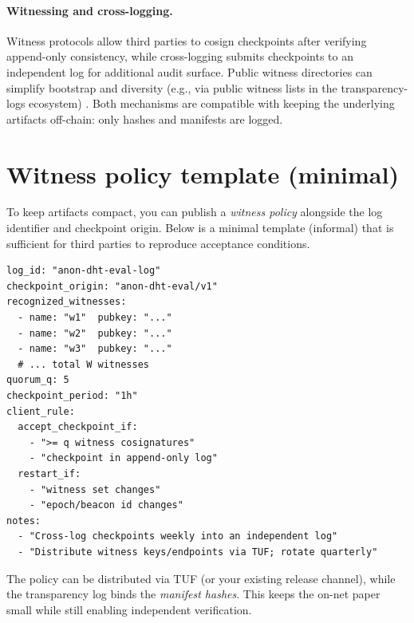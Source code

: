 \documentclass[11pt]{article}
\begin{document}
\paragraph{Witnessing and cross-logging.}
Witness protocols allow third parties to cosign checkpoints after verifying append-only consistency, while cross-logging submits checkpoints to an independent log for additional audit surface. Public witness directories can simplify bootstrap and diversity (e.g., via public witness lists in the transparency-logs ecosystem) \cite{c2sp_tlog_witness}.
Both mechanisms are compatible with keeping the underlying artifacts off-chain: only hashes and manifests are logged.


\section{Witness policy template (minimal)}
To keep artifacts compact, you can publish a \emph{witness policy} alongside the log identifier and checkpoint origin.
Below is a minimal template (informal) that is sufficient for third parties to reproduce acceptance conditions.

\begin{verbatim}
log_id: "anon-dht-eval-log"
checkpoint_origin: "anon-dht-eval/v1"
recognized_witnesses:
  - name: "w1"  pubkey: "..."
  - name: "w2"  pubkey: "..."
  - name: "w3"  pubkey: "..."
  # ... total W witnesses
quorum_q: 5
checkpoint_period: "1h"
client_rule:
  accept_checkpoint_if:
    - ">= q witness cosignatures"
    - "checkpoint in append-only log"
  restart_if:
    - "witness set changes"
    - "epoch/beacon id changes"
notes:
  - "Cross-log checkpoints weekly into an independent log"
  - "Distribute witness keys/endpoints via TUF; rotate quarterly"
\end{verbatim}

The policy can be distributed via TUF (or your existing release channel), while the transparency log binds the \emph{manifest hashes}.
This keeps the on-net paper small while still enabling independent verification.
\end{document}
